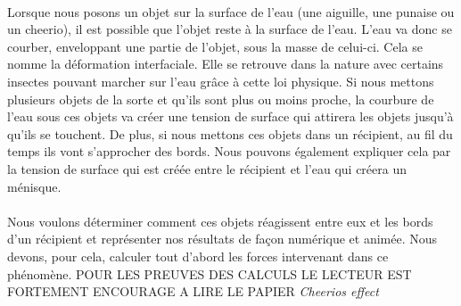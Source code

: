         \paragraph*{}{
            Lorsque nous posons un objet sur la surface de l'eau (une aiguille, une punaise ou un cheerio), il est possible que l'objet reste à la surface de l'eau. L'eau va donc se courber, enveloppant une partie de l'objet, sous la masse de celui-ci. Cela se nomme la déformation interfaciale. Elle se retrouve dans la nature avec certains insectes pouvant marcher sur l'eau grâce à cette loi physique. Si nous mettons plusieurs objets de la sorte et qu'ils sont plus ou moins proche, la courbure de l'eau sous ces objets va créer une tension de surface qui attirera les objets jusqu'à qu'ils se touchent. De plus, si nous mettons ces objets dans un récipient, au fil du temps ils vont s'approcher des bords. Nous pouvons également expliquer cela par la tension de surface qui est créée entre le récipient et l'eau qui créera un ménisque.
            }
        \paragraph*{}{
            Nous voulons déterminer comment ces objets réagissent entre eux et les bords d'un récipient et représenter nos résultats de façon numérique et animée. Nous devons, pour cela, calculer tout d'abord les forces intervenant dans ce phénomène.
        } 
        POUR LES PREUVES DES CALCULS LE LECTEUR EST FORTEMENT ENCOURAGE A LIRE LE PAPIER \textit{Cheerios effect}\cite{vella_cheerios_2005} 



        
